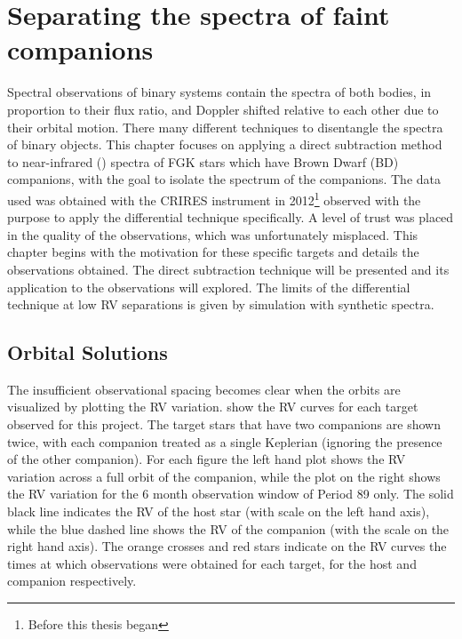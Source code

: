 
\chapter{Separating the spectra of faint companions} %
\label{cha:direct_recovery}

Spectral observations of binary systems contain the spectra of both bodies, in proportion to their flux ratio, and Doppler shifted relative to each other due to their orbital motion.
There many different techniques to disentangle the spectra of binary objects.
This chapter focuses on applying a direct subtraction method to near-infrared (\nir{}) spectra of {FGK} stars which have Brown Dwarf (BD) companions, with the goal to isolate the spectrum of the companions.
The data used was obtained with the {CRIRES} instrument in 2012\footnote{Before this thesis began} observed with the purpose to apply the differential technique specifically.
A level of trust was placed in the quality of the observations, which was unfortunately misplaced.
This chapter begins with the motivation for these specific targets and details the observations obtained.
The direct subtraction technique will be presented and its application to the observations will explored.
The limits of the differential technique at low {RV} separations is given by simulation with synthetic spectra.


















\section{Orbital Solutions}
\label{sec:orbtial_diagrams}
The insufficient observational spacing becomes clear when the orbits are visualized by plotting the {RV} variation.
 show the {RV} curves for each target observed for this project.
The target stars that have two companions are shown twice, with each companion treated as a single Keplerian (ignoring the presence of the other companion).
For each figure the left hand plot shows the {RV} variation across a full orbit of the companion, while the plot on the right shows the {RV} variation for the 6 month observation window of {Period 89} only.
The solid black line indicates the {RV} of the host star (with scale on the left hand axis), while the blue dashed line shows the {RV} of the companion (with the scale on the right hand axis).
The orange crosses and red stars indicate on the {RV} curves the times at which observations were obtained for each target, for the host and companion respectively.

